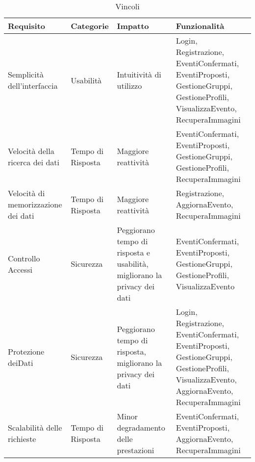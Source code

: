 \begin{table}[htbp]
    \centering
    \begin{tabular} {|P{3.5cm}|P{2cm}|P{3.5cm}|P{6cm}|}
        \hline
        \textbf{Requisito}                  & \textbf{Categorie} & \textbf{Impatto}                                                         & \textbf{Funzionalità}                                                                                                                       \\
        \hline
        Semplicità dell'interfaccia         & Usabilità          & Intuitività di utilizzo                                                  & Login, Registrazione, EventiConfermati, EventiProposti, GestioneGruppi, GestioneProfili, VisualizzaEvento, RecuperaImmagini                 \\
        \hline
        Velocità della ricerca dei dati     & Tempo di Risposta  & Maggiore reattività                                                      & EventiConfermati, EventiProposti, GestioneGruppi, GestioneProfili, RecuperaImmagini                                                         \\
        \hline
        Velocità di memorizzazione dei dati & Tempo di Risposta  & Maggiore reattività                                                      & Registrazione, AggiornaEvento, RecuperaImmagini                                                                                             \\
        \hline
        Controllo Accessi                   & Sicurezza          & Peggiorano tempo di risposta e usabilità, migliorano la privacy dei dati & EventiConfermati, EventiProposti, GestioneGruppi, GestioneProfili, VisualizzaEvento                                                         \\
        \hline
        Protezione dei\linebreak Dati       & Sicurezza          & Peggiorano tempo di risposta, migliorano la privacy dei dati             & Login, Registrazione, EventiConfermati, EventiProposti, GestioneGruppi, GestioneProfili, VisualizzaEvento, AggiornaEvento, RecuperaImmagini \\
        \hline
        Scalabilità delle richieste         & Tempo di Risposta  & Minor degradamento delle prestazioni                                     & EventiConfermati, EventiProposti, AggiornaEvento, RecuperaImmagini                                                                          \\
        \hline
    \end{tabular}
    \caption{Vincoli}
\end{table}



